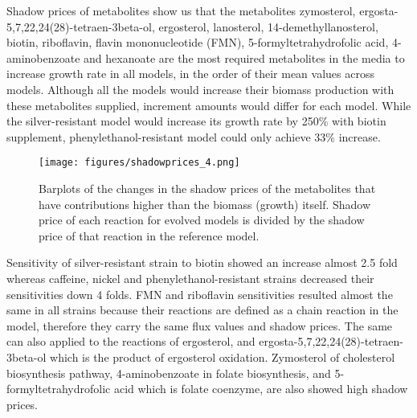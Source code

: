 \vspace{0.2cm}


\vspace{-1.0cm}

Shadow prices of metabolites show us that the metabolites zymosterol, ergosta-5,7,22,24(28)-tetraen-3beta-ol, ergosterol, lanosterol, 14-demethyllanosterol, biotin, riboflavin, flavin mononucleotide (FMN), 5-formyltetrahydrofolic acid, 4-aminobenzoate and hexanoate are the most required metabolites in the media to increase growth rate in all models, in the order of their mean values across models. Although all the models would increase their biomass production with these metabolites supplied, increment amounts would differ for each model. While the silver-resistant model would increase its growth rate by 250\% with biotin supplement, phenylethanol-resistant model could only achieve 33\% increase.

\begin{figure}[H]
  \begin{center}
  \texttt{[image: figures/shadowprices\_4.png]}
  \caption[Barplots of the changes in the shadow prices of the metabolites that have contributions higher than the biomass (growth) itself. Shadow price of each reaction for evolved models is divided by the shadow price of that reaction in the reference model]{Barplots of the changes in the shadow prices of the metabolites that have contributions higher than the biomass (growth) itself. Shadow price of each reaction for evolved models is divided by the shadow price of that reaction in the reference model.}
  \label{fig:fba_shadowprices_free}
  \end{center}
\end{figure}

\vspace{-1.0cm}

Sensitivity of silver-resistant strain to biotin showed an increase almost 2.5 fold whereas caffeine, nickel and phenylethanol-resistant strains decreased their sensitivities down 4 folds. FMN and riboflavin sensitivities resulted almost the same in all strains because their reactions are defined as a chain reaction in the model, therefore they carry the same flux values and shadow prices. The same can also applied to the reactions of ergosterol, and ergosta-5,7,22,24(28)-tetraen-3beta-ol which is the product of ergosterol oxidation. Zymosterol of cholesterol biosynthesis pathway, 4-aminobenzoate in folate biosynthesis, and 5-formyltetrahydrofolic acid which is folate coenzyme, are also showed high shadow prices.

